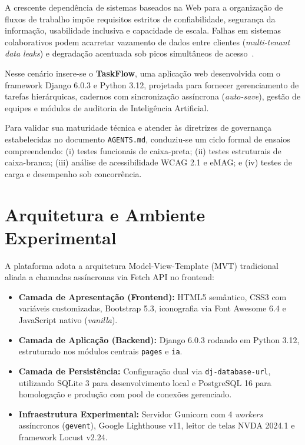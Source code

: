 \documentclass[12pt]{article}
\begin{document}
A crescente dependência de sistemas baseados na Web para a organização de fluxos de trabalho impõe requisitos estritos de confiabilidade, segurança da informação, usabilidade inclusiva e capacidade de escala. Falhas em sistemas colaborativos podem acarretar vazamento de dados entre clientes (\textit{multi-tenant data leaks}) e degradação acentuada sob picos simultâneos de acesso~\cite{pressman2021}.

Nesse cenário insere-se o \textbf{TaskFlow}, uma aplicação web desenvolvida com o framework Django 6.0.3 e Python 3.12, projetada para fornecer gerenciamento de tarefas hierárquicas, cadernos com sincronização assíncrona (\textit{auto-save}), gestão de equipes e módulos de auditoria de Inteligência Artificial.

Para validar sua maturidade técnica e atender às diretrizes de governança estabelecidas no documento \texttt{AGENTS.md}, conduziu-se um ciclo formal de ensaios compreendendo: (i) testes funcionais de caixa-preta; (ii) testes estruturais de caixa-branca; (iii) análise de acessibilidade WCAG 2.1 e eMAG; e (iv) testes de carga e desempenho sob concorrência.

\section{Arquitetura e Ambiente Experimental}

A plataforma adota a arquitetura Model-View-Template (MVT) tradicional aliada a chamadas assíncronas via Fetch API no frontend:
\begin{itemize}
    \item \textbf{Camada de Apresentação (Frontend):} HTML5 semântico, CSS3 com variáveis customizadas, Bootstrap 5.3, iconografia via Font Awesome 6.4 e JavaScript nativo (\textit{vanilla}).
    \item \textbf{Camada de Aplicação (Backend):} Django 6.0.3 rodando em Python 3.12, estruturado nos módulos centrais \texttt{pages} e \texttt{ia}.
    \item \textbf{Camada de Persistência:} Configuração dual via \texttt{dj-database-url}, utilizando SQLite 3 para desenvolvimento local e PostgreSQL 16 para homologação e produção com pool de conexões gerenciado.
    \item \textbf{Infraestrutura Experimental:} Servidor Gunicorn com 4 \textit{workers} assíncronos (\texttt{gevent}), Google Lighthouse v11, leitor de telas NVDA 2024.1 e framework Locust v2.24.
\end{itemize}
\end{document}
